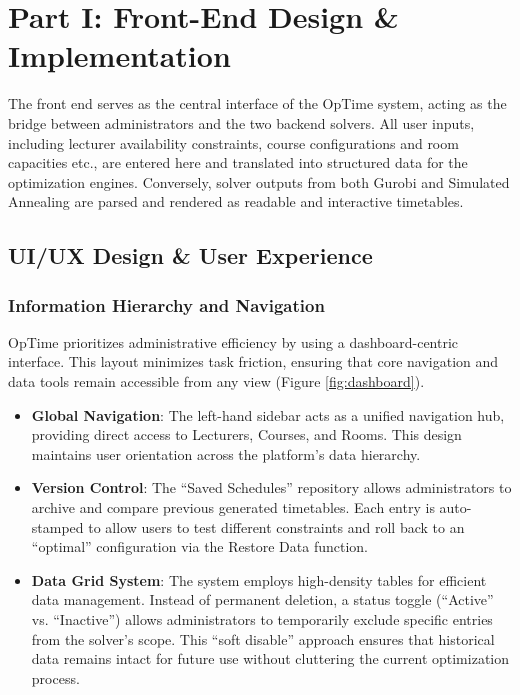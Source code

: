 \documentclass[11pt,a4paper]{article}
\begin{document}
\section{Part I: Front-End Design \& Implementation}
The front end serves as the central interface of the OpTime system, acting as the bridge between administrators and the two backend solvers. All user inputs, including lecturer availability constraints, course configurations and room capacities etc., are entered here and translated into structured data for the optimization engines. Conversely, solver outputs from both Gurobi and Simulated Annealing are parsed and rendered as readable and interactive timetables.
\subsection{UI/UX Design \& User Experience}
\subsubsection{Information Hierarchy and Navigation}
OpTime prioritizes administrative efficiency by using a dashboard-centric interface. This layout minimizes task friction, ensuring that core navigation and data tools remain accessible from any view (Figure \ref{fig:dashboard}).
\begin{itemize}
    \item \textbf{Global Navigation}: The left-hand sidebar acts as a unified navigation hub, providing direct access to Lecturers, Courses, and Rooms. This design maintains user orientation across the platform's data hierarchy.
    \item \textbf{Version Control}: The ``Saved Schedules'' repository allows administrators to archive and compare previous generated timetables. Each entry is auto-stamped to allow users to test different constraints and roll back to an ``optimal'' configuration via the Restore Data function.
    \item \textbf{Data Grid System}: The system employs high-density tables for efficient data management. Instead of permanent deletion, a status toggle (``Active'' vs. ``Inactive'') allows administrators to temporarily exclude specific entries from the solver's scope. This ``soft disable'' approach ensures that historical data remains intact for future use without cluttering the current optimization process.
\end{itemize}
\end{document}
